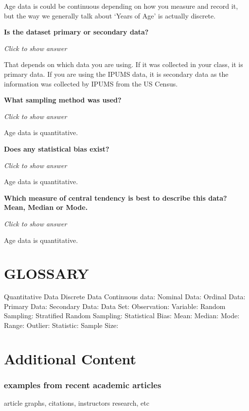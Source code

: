\documentclass[
]{book}
\begin{document}
Age data is could be continuous depending on how you measure and record it,
but the way we generally talk about `Years of Age' is actually discrete.

\textbf{Is the dataset primary or secondary data?}

\emph{Click to show answer}

That depends on which data you are using. If it was collected in your class, it is primary data. If you are using the IPUMS data, it is secondary data as the information was collected by IPUMS from the US Census.

\textbf{What sampling method was used?}

\emph{Click to show answer}

Age data is quantitative.

\textbf{Does any statistical bias exist?}

\emph{Click to show answer}

Age data is quantitative.

\textbf{Which measure of central tendency is best to describe this data? Mean, Median or Mode.}

\emph{Click to show answer}

Age data is quantitative.

\hypertarget{glossary}{%
\section{GLOSSARY}\label{glossary}}

Quantitative Data
Discrete Data
Continuous data:
Nominal Data:
Ordinal Data:
Primary Data:
Secondary Data:
Data Set:
Observation:
Variable:
Random Sampling:
Stratified Random Sampling:
Statistical Bias:
Mean:
Median:
Mode:
Range:
Outlier:
Statistic:
Sample Size:

\hypertarget{additional-content}{%
\section{Additional Content}\label{additional-content}}

\hypertarget{examples-from-recent-academic-articles}{%
\subsubsection{examples from recent academic articles}\label{examples-from-recent-academic-articles}}

article graphs, citations, instructors research, etc
\end{document}
